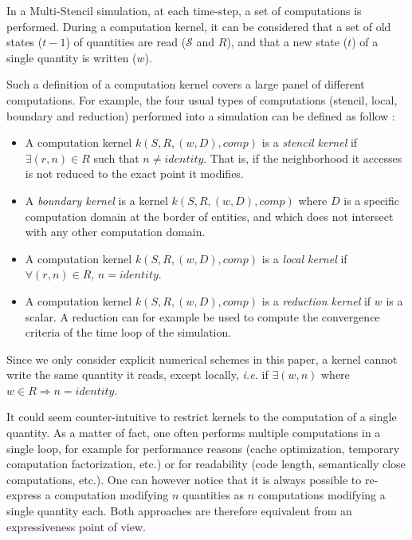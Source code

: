 In a Multi-Stencil simulation, at each time-step, a set of computations is performed. During a computation kernel, it can be considered that a set of old states ($t-1$) of quantities are read ($\mathcal{S}$ and $R$), and that a new state ($t$) of a single quantity is written ($w$).

Such a definition of a computation kernel covers a large panel of different computations. For example, the four usual types of computations (stencil, local, boundary and reduction) performed into a simulation can be defined as follow :
\begin{itemize}
\item A computation kernel $k(S,R,(w,D),comp)$ is a \emph{stencil kernel} if $\exists (r,n) \in R$ such that $n \neq identity$. That is, if the neighborhood it accesses is not reduced to the exact point it modifies.
\item A \emph{boundary kernel} is a kernel $k(S,R,(w,D),comp)$ where $D$ is a specific computation domain at the border of entities, and which does not intersect with any other computation domain.
\item A computation kernel $k(S,R,(w,D),comp)$ is a \emph{local kernel} if $\forall (r,n) \in R$, $n = identity$.
\item A computation kernel $k(S,R,(w,D),comp)$ is a \emph{reduction kernel} if $w$ is a scalar. A reduction can for example be used to compute the convergence criteria of the time loop of the simulation.
\end{itemize}

Since we only consider explicit numerical schemes in this paper, a kernel cannot write the same quantity it reads, except locally, \textit{i.e.} if $\exists (w,n)$ where $w \in R\Rightarrow n=identity$.

It could seem counter-intuitive to restrict kernels to the computation of a single quantity.
As a matter of fact, one often performs multiple computations in a single loop, for example for performance reasons (cache optimization, temporary computation factorization, etc.) or for readability (code length, semantically close computations, etc.).
One can however notice that it is always possible to re-express a computation modifying $n$ quantities as $n$ computations modifying a single quantity each.
Both approaches are therefore equivalent from an expressiveness point of view.


